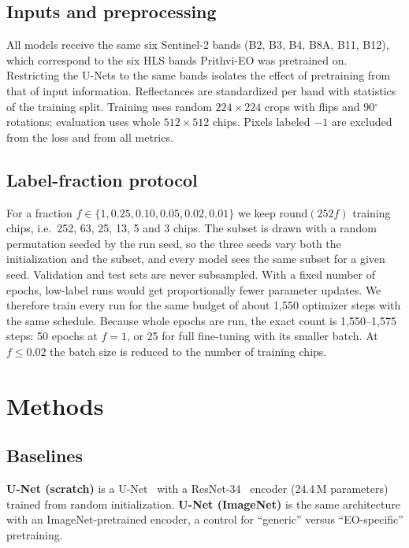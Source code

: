 \documentclass[conference]{IEEEtran}
\begin{document}
\subsection{Inputs and preprocessing}
All models receive the same six Sentinel-2 bands (B2, B3, B4, B8A, B11, B12), which correspond to the six HLS bands Prithvi-EO was pretrained on. Restricting the U-Nets to the same bands isolates the effect of pretraining from that of input information. Reflectances are standardized per band with statistics of the training split. Training uses random $224\times224$ crops with flips and 90$^\circ$ rotations; evaluation uses whole $512\times512$ chips. Pixels labeled $-1$ are excluded from the loss and from all metrics.

\subsection{Label-fraction protocol}
For a fraction $f\in\{1, 0.25, 0.10, 0.05, 0.02, 0.01\}$ we keep $\mathrm{round}(252 f)$ training chips, i.e.\ 252, 63, 25, 13, 5 and 3 chips. The subset is drawn with a random permutation seeded by the run seed, so the three seeds vary both the initialization and the subset, and every model sees the same subset for a given seed. Validation and test sets are never subsampled. With a fixed number of epochs, low-label runs would get proportionally fewer parameter updates. We therefore train every run for the same budget of about 1{,}550 optimizer steps with the same schedule. Because whole epochs are run, the exact count is 1{,}550--1{,}575 steps: 50 epochs at $f=1$, or 25 for full fine-tuning with its smaller batch. At $f\le0.02$ the batch size is reduced to the number of training chips.

\section{Methods}
\subsection{Baselines}
\textbf{U-Net (scratch)} is a U-Net~\cite{ronneberger2015unet} with a ResNet-34~\cite{he2016resnet} encoder (24.4\,M parameters) trained from random initialization. \textbf{U-Net (ImageNet)} is the same architecture with an ImageNet-pretrained encoder, a control for ``generic'' versus ``EO-specific'' pretraining.
\end{document}
